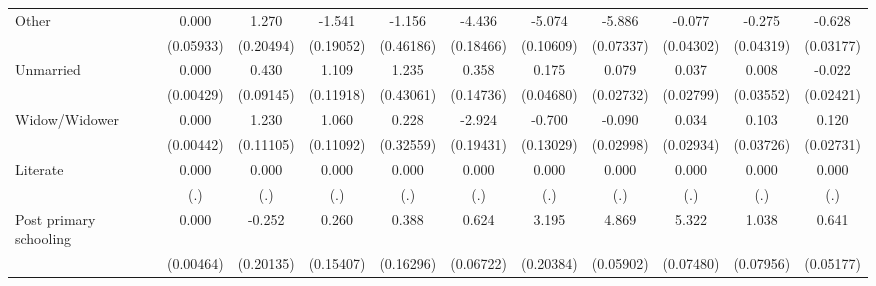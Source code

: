{\begin{tabular}{l*{10}{c}}
Other               &       0.000         &       1.270\sym{***}&      -1.541\sym{***}&      -1.156\sym{*}  &      -4.436\sym{***}&      -5.074\sym{***}&      -5.886\sym{***}&      -0.077         &      -0.275\sym{***}&      -0.628\sym{***}\\
                    &   (0.05933)         &   (0.20494)         &   (0.19052)         &   (0.46186)         &   (0.18466)         &   (0.10609)         &   (0.07337)         &   (0.04302)         &   (0.04319)         &   (0.03177)         \\
Unmarried           &       0.000         &       0.430\sym{***}&       1.109\sym{***}&       1.235\sym{**} &       0.358\sym{*}  &       0.175\sym{***}&       0.079\sym{**} &       0.037         &       0.008         &      -0.022         \\
                    &   (0.00429)         &   (0.09145)         &   (0.11918)         &   (0.43061)         &   (0.14736)         &   (0.04680)         &   (0.02732)         &   (0.02799)         &   (0.03552)         &   (0.02421)         \\
Widow/Widower       &       0.000         &       1.230\sym{***}&       1.060\sym{***}&       0.228         &      -2.924\sym{***}&      -0.700\sym{***}&      -0.090\sym{**} &       0.034         &       0.103\sym{**} &       0.120\sym{***}\\
                    &   (0.00442)         &   (0.11105)         &   (0.11092)         &   (0.32559)         &   (0.19431)         &   (0.13029)         &   (0.02998)         &   (0.02934)         &   (0.03726)         &   (0.02731)         \\
Literate            &       0.000         &       0.000         &       0.000         &       0.000         &       0.000         &       0.000         &       0.000         &       0.000         &       0.000         &       0.000         \\
                    &         (.)         &         (.)         &         (.)         &         (.)         &         (.)         &         (.)         &         (.)         &         (.)         &         (.)         &         (.)         \\
Post primary schooling&       0.000         &      -0.252         &       0.260         &       0.388\sym{*}  &       0.624\sym{***}&       3.195\sym{***}&       4.869\sym{***}&       5.322\sym{***}&       1.038\sym{***}&       0.641\sym{***}\\
                    &   (0.00464)         &   (0.20135)         &   (0.15407)         &   (0.16296)         &   (0.06722)         &   (0.20384)         &   (0.05902)         &   (0.07480)         &   (0.07956)         &   (0.05177)         \\

\end{tabular}}
